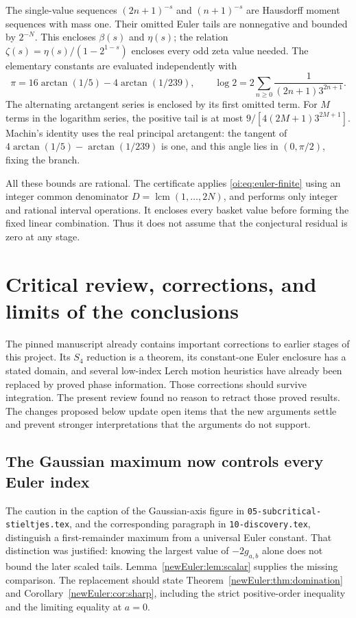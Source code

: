 \documentclass[11pt,letterpaper]{article}
\theoremstyle{definition}
\theoremstyle{remark}
\newcommand{\code}[1]{\nolinkurl{#1}}
\begin{document}
The single-value sequences $(2n+1)^{-s}$ and $(n+1)^{-s}$ are
Hausdorff moment sequences with mass one.  Their omitted Euler tails
are nonnegative and bounded by $2^{-N}$.  This encloses $\beta(s)$
and $\eta(s)$; the relation
$\zeta(s)=\eta(s)/(1-2^{1-s})$ encloses every odd zeta value needed.
The elementary constants are evaluated independently with
\[
 \pi=16\arctan(1/5)-4\arctan(1/239),\qquad
 \log2=2\sum_{n\geq0}\frac1{(2n+1)3^{2n+1}}.
\]
The alternating arctangent series is enclosed by its first omitted
term.  For $M$ terms in the logarithm series, the positive tail is at
most $9/[4(2M+1)3^{2M+1}]$.  Machin's identity uses the real principal
arctangent: the tangent of $4\arctan(1/5)-\arctan(1/239)$ is one,
and this angle lies in $(0,\pi/2)$, fixing the branch.

All these bounds are rational.  The certificate applies
\eqref{oi:eq:euler-finite} using an integer common denominator
$D=\operatorname{lcm}(1,\ldots,2N)$, and performs only integer and
rational interval operations.  It encloses every basket value before
forming the fixed linear combination.  Thus it does not assume that
the conjectural residual is zero at any stage.


\section{Critical review, corrections, and limits of the conclusions}
\label{sec:review}

The pinned manuscript already contains important corrections to earlier
stages of this project. Its $S_4$ reduction is a theorem, its constant-one
Euler enclosure has a stated domain, and several low-index Lerch motion
heuristics have already been replaced by proved phase information.
Those corrections should survive integration. The present review found
no reason to retract those proved results. The changes proposed below
update open items that the new arguments settle and prevent stronger
interpretations that the arguments do not support.

\subsection{The Gaussian maximum now controls every Euler index}

The caution in the caption of the Gaussian-axis figure in
\code{05-subcritical-stieltjes.tex}, and the corresponding paragraph in
\code{10-discovery.tex}, distinguish a first-remainder maximum from a
universal Euler constant. That distinction was justified: knowing the
largest value of $-2g_{a,b}$ alone does not bound the later scaled tails.
Lemma~\ref{newEuler:lem:scalar} supplies the missing comparison. The
replacement should state Theorem~\ref{newEuler:thm:domination} and
Corollary~\ref{newEuler:cor:sharp}, including the strict positive-order
inequality and the limiting equality at $a=0$.
\end{document}
